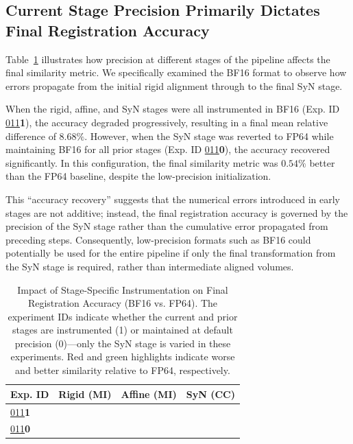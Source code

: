 \documentclass[journal,twoside,web]{ieeecolor}
\begin{document}
\subsection{Current Stage Precision Primarily Dictates Final Registration Accuracy}
Table~\ref{tab:stage-accuracy} illustrates how precision at different stages of the pipeline affects the final similarity metric. We specifically examined the BF16 format to observe how errors propagate from the initial rigid alignment through to the final SyN stage.

When the rigid, affine, and SyN stages were all instrumented in BF16 (Exp. ID \uline{011}\textbf{1}), the accuracy degraded progressively, resulting in a final mean relative difference of $8.68\%$. However, when the SyN stage was reverted to FP64 while maintaining BF16 for all prior stages (Exp. ID \uline{011}\textbf{0}), the accuracy recovered significantly. In this configuration, the final similarity metric was $0.54\%$ better than the FP64 baseline, despite the low-precision initialization.

This ``accuracy recovery'' suggests that the numerical errors introduced in early stages are not additive; instead, the final registration accuracy is governed by the precision of the SyN stage rather than the cumulative error propagated from preceding steps. Consequently, low-precision formats such as BF16 could potentially be used for the entire pipeline if only the final transformation from the SyN stage is required, rather than intermediate aligned volumes.

\begin{table}[htb!]
	\centering
	\begin{tabular}{@{}llll@{}}
		\toprule
		\multicolumn{1}{c}{\textbf{Exp. ID}} & \multicolumn{1}{c}{\textbf{Rigid (MI)}} & \multicolumn{1}{c}{\textbf{Affine (MI)}} & \multicolumn{1}{c}{\textbf{SyN (CC)}} \\ \midrule
		{\uline{011}\textbf{1}}              & \cellcolor{RedHL}{2.34e-02}             & \cellcolor{RedHL}{1.86e-01}              & \cellcolor{RedHL}{8.68e-02}           \\
		{\uline{011}\textbf{0}}              & \cellcolor{RedHL}{2.34e-02}             & \cellcolor{RedHL}{1.86e-01}              & \cellcolor{GreenHL}{-5.38e-03}        \\ \bottomrule
	\end{tabular}
	\caption{Impact of Stage-Specific Instrumentation on Final Registration Accuracy (BF16 vs. FP64). The experiment IDs indicate whether the current and prior stages are instrumented (1) or maintained at default precision (0)---only the SyN stage is varied in these experiments. Red and green highlights indicate worse and better similarity relative to FP64, respectively.}
	\label{tab:stage-accuracy}
\end{table}
\end{document}
